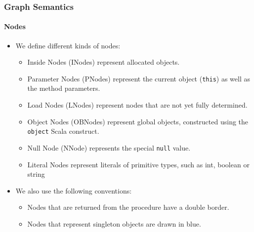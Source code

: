 \documentclass[hyperref={pdfpagelabels=false}]{beamer}
\begin{document}
\begin{frame}
    \frametitle{Graph Semantics}
    \framesubtitle{Nodes}

    \begin{itemize}
        \item We define different kinds of nodes:
            \begin{itemize}
                \item Inside Nodes (INodes) represent allocated objects.
                \item Parameter Nodes (PNodes) represent the current object
                    (\lstinline{this}) as well as the method parameters.
                \item Load Nodes (LNodes) represent nodes that are not yet
                    fully determined.
                \item Object Nodes (OBNodes) represent global objects,
                    constructed using the \lstinline{object} Scala construct.
                \item Null Node (NNode) represents the special
                    \lstinline{null} value.
                \item Literal Nodes represent literals of primitive types, such as
                    int, boolean or string
            \end{itemize}
        \item We also use the following conventions:
            \begin{itemize}
                \item Nodes that are returned from the procedure have a double
                border.
                \item Nodes that represent singleton objects are drawn in
                blue.
            \end{itemize}
    \end{itemize}
\end{frame}
\end{document}
